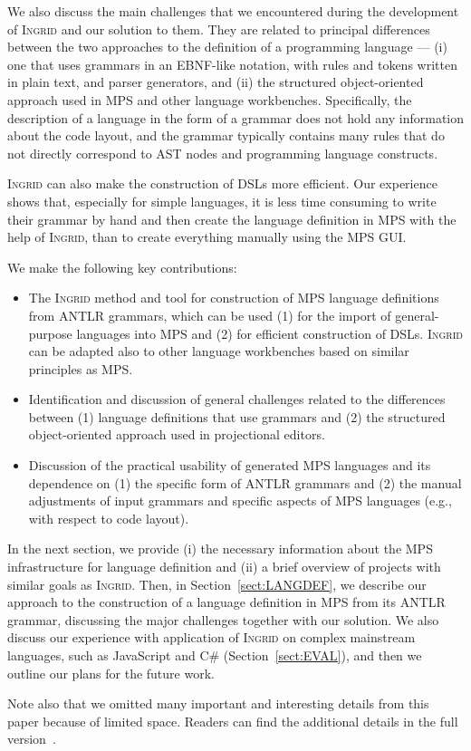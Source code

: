 We also discuss the main challenges that we encountered during the development of \textsc{Ingrid} and our solution to them.
They are related to principal differences between the two approaches to the definition of a programming language --- (i) one that uses grammars in an EBNF-like notation, with rules and tokens written in plain text, and parser generators, and (ii) the structured object-oriented approach used in MPS and other language workbenches.
Specifically, the description of a language in the form of a grammar does not hold any information about the code layout, and the grammar typically contains many rules that do not directly correspond to AST nodes and programming language constructs.

\textsc{Ingrid} can also make the construction of DSLs more efficient.
Our experience shows that, especially for simple languages, it is less time consuming to write their grammar by hand and then create the language definition in MPS with the help of \textsc{Ingrid}, than to create everything manually using the MPS GUI.

We make the following key contributions:
\begin{itemize}
	\item The \textsc{Ingrid} method and tool for construction of MPS language definitions from ANTLR grammars, which can be used (1) for the import of general-purpose languages into MPS and (2) for efficient construction of DSLs. \textsc{Ingrid} can be adapted also to other language workbenches based on similar principles as MPS.
	\item Identification and discussion of general challenges related to the differences between (1) language definitions that use grammars and (2) the structured object-oriented approach used in projectional editors.
	\item Discussion of the practical usability of generated MPS languages and its dependence on (1) the specific form of ANTLR grammars and (2) the manual adjustments of input grammars and specific aspects of MPS languages (e.g., with respect to code layout).
\end{itemize}

In the next section, we provide (i) the necessary information about the MPS infrastructure for language definition and (ii) a brief overview of projects with similar goals as \textsc{Ingrid}.
Then, in Section~\ref{sect:LANGDEF}, we describe our approach to the construction of a language definition in MPS from its ANTLR grammar, discussing the major challenges together with our solution.
We also discuss our experience with application of \textsc{Ingrid} on complex mainstream languages, such as JavaScript and C\# (Section~\ref{sect:EVAL}), and then we outline our plans for the future work.

Note also that we omitted many important and interesting details from this paper because of limited space.
Readers can find the additional details in the full version~\cite{ref:TRFULL}.

